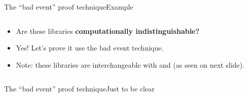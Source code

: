 \documentclass[aspectratio=169, lualatex, handout]{beamer}
\begin{document}
\begin{frame}{The ``bad event'' proof technique}{Example}
	\begin{columns}[c]
		\begin{column}{0.5\textwidth}
			\begin{itemize}
				\item Are these libraries \textbf{computationally indistinguishable?}
				\item Yes! Let's prove it use the bad event technique.
				\item Note: these libraries are interchangeable with  and  (as seen on next slide).
			\end{itemize}
		\end{column}
		\begin{column}{0.5\textwidth}
		\end{column}
	\end{columns}
\end{frame}

\begin{frame}{The ``bad event'' proof technique}{Just to be clear}
\end{frame}
\end{document}
